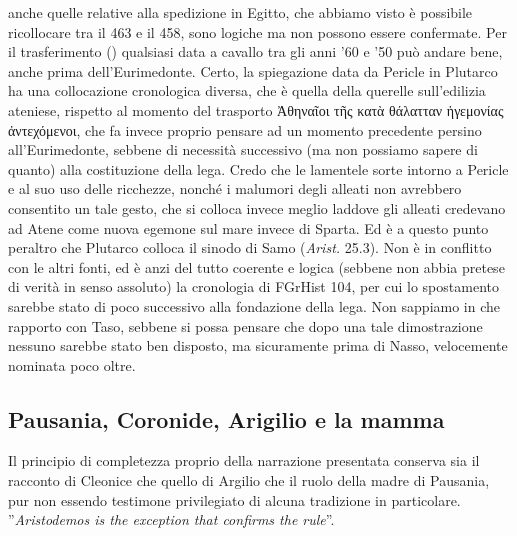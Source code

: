 {anche quelle relative alla spedizione in Egitto, che abbiamo visto è possibile ricollocare tra il 463 e il 458, sono logiche ma non possono essere confermate. Per il trasferimento (\cite{Pritchett1969}) qualsiasi data a cavallo tra gli anni '60 e '50 può andare bene, anche prima dell'Eurimedonte. Certo, la spiegazione data da Pericle in Plutarco ha una collocazione cronologica diversa, che è quella della querelle sull'edilizia ateniese, rispetto al momento del trasporto \textgreek{Ἀθηναῖοι τῆς κατὰ θάλατταν ἡγεμονίας ἀντεχόμενοι}, che fa invece proprio pensare ad un momento precedente persino all'Eurimedonte, sebbene di necessità successivo (ma non possiamo sapere di quanto) alla costituzione della lega. Credo che le lamentele sorte intorno a Pericle e al suo uso delle ricchezze, nonché i malumori degli alleati non avrebbero consentito un tale gesto, che si colloca invece meglio laddove gli alleati credevano ad Atene come nuova egemone sul mare invece di Sparta. Ed è  a questo punto peraltro che Plutarco colloca il sinodo di Samo (\emph{Arist. }25.3). Non è in conflitto con le altri fonti, ed è anzi del tutto coerente e logica (sebbene non abbia pretese di verità in senso assoluto) la cronologia di FGrHist 104, per cui lo spostamento sarebbe stato di poco successivo alla fondazione della lega. Non sappiamo in che rapporto con Taso, sebbene si possa pensare che dopo una tale dimostrazione nessuno sarebbe stato ben disposto, ma sicuramente prima di Nasso, velocemente nominata poco oltre. 
            \subsection*{Pausania,  Coronide, Arigilio e la mamma}
            Il principio di completezza proprio della narrazione presentata conserva sia il racconto di Cleonice che quello di Argilio  che il ruolo della madre di Pausania, pur non essendo testimone privilegiato di alcuna tradizione in particolare. \cite[121]{Ogden2002} ''\emph{Aristodemos is the exception that confirms the rule}''.
}
